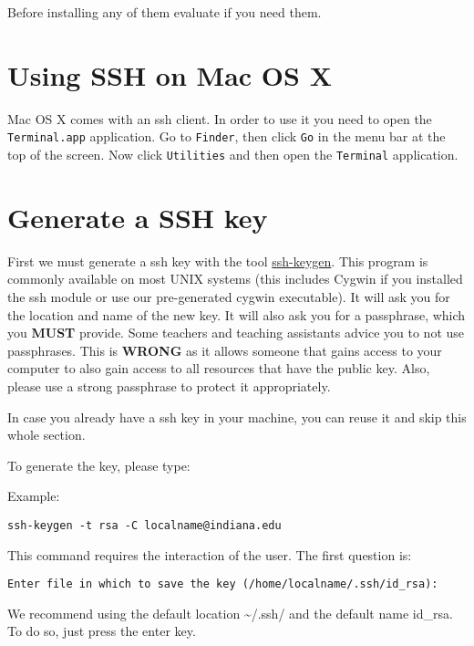 Before installing any of them evaluate if you need them.

\section{Using SSH on Mac OS X}\label{using-ssh-on-mac-os-x}

Mac OS X comes with an ssh client. In order to use it you need to open
the \texttt{Terminal.app} application. Go to \texttt{Finder}, then click
\texttt{Go} in the menu bar at the top of the screen. Now click
\texttt{Utilities} and then open the \texttt{Terminal} application.

\section{Generate a SSH key}\label{generate-a-ssh-key}

First we must generate a ssh key with the tool
\href{http://linux.die.net/man/1/ssh-keygen}{ssh-keygen}. This program
is commonly available on most UNIX systems (this includes Cygwin if you
installed the ssh module or use our pre-generated cygwin executable). It
will ask you for the location and name of the new key. It will also ask
you for a passphrase, which you \textbf{MUST} provide. Some teachers and
teaching assistants advice you to not use passphrases. This is
\textbf{WRONG} as it allows someone that gains access to your computer
to also gain access to all resources that have the public key. Also,
please use a strong passphrase to protect it appropriately.

In case you already have a ssh key in your machine, you can reuse it and
skip this whole section.

To generate the key, please type:

Example:

\begin{verbatim}
ssh-keygen -t rsa -C localname@indiana.edu
\end{verbatim}

This command requires the interaction of the user. The first question
is:

\begin{verbatim}
Enter file in which to save the key (/home/localname/.ssh/id_rsa): 
\end{verbatim}

We recommend using the default location \textasciitilde{}/.ssh/ and the
default name id\_rsa. To do so, just press the enter key.

